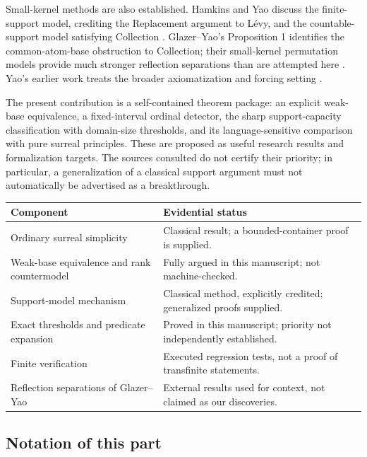 \documentclass[11pt,letterpaper]{article}
\theoremstyle{definition}
\theoremstyle{remark}
\begin{document}
Small-kernel methods are also established. Hamkins and Yao discuss the finite-support model, crediting the Replacement argument to L\'evy, and the countable-support model satisfying Collection \cite[\S1.5]{HamkinsYao}. Glazer--Yao's Proposition 1 identifies the common-atom-base obstruction to Collection; their small-kernel permutation models provide much stronger reflection separations than are attempted here \cite{GlazerYao}. Yao's earlier work treats the broader axiomatization and forcing setting \cite{YaoForcing}.

The present contribution is a self-contained theorem package: an explicit weak-base equivalence, a fixed-interval ordinal detector, the sharp support-capacity classification with domain-size thresholds, and its language-sensitive comparison with pure surreal principles. These are proposed as useful research results and formalization targets. The sources consulted do not certify their priority; in particular, a generalization of a classical support argument must not automatically be advertised as a breakthrough.

\begin{center}
\small
\begin{tabularx}{\textwidth}{@{}P{0.30\textwidth}Y@{}}
\toprule
Component & Evidential status \\
\midrule
Ordinary surreal simplicity & Classical result; a bounded-container proof is supplied. \\
Weak-base equivalence and rank countermodel & Fully argued in this manuscript; not machine-checked. \\
Support-model mechanism & Classical method, explicitly credited; generalized proofs supplied. \\
Exact thresholds and predicate expansion & Proved in this manuscript; priority not independently established. \\
Finite verification & Executed regression tests, not a proof of transfinite statements. \\
Reflection separations of Glazer--Yao & External results used for context, not claimed as our discoveries. \\
\bottomrule
\end{tabularx}
\end{center}

\subsection{Notation of this part}
\label{hset:zr:sub:notation}
\end{document}
